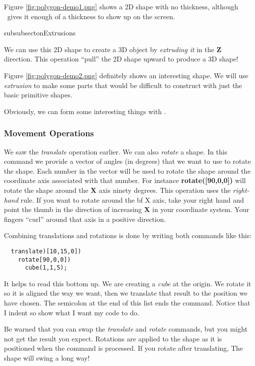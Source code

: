 Figure \ref{fig:polygon-demo1.png} shows a  2D shape with no thickness, although
\osc\ gives it enough of a thickness to show up on the screen.

subsubsecton{Extrusions}

We can use this 2D shape to create a 3D object by {\it extruding it} in the
{\bf Z} direction. This operation ``pull'' the 2D shape upward to produce a 3D
shape!


Figure \ref{fig:polygon-demo2.png} definitely shows an interesting shape. We
will use {\it extrusion} to make some parts that would be difficult to construct
with just the basic primitive shapes.


Obviously, we can form some interesting things with \osc.

\subsubsection{Movement Operations}

We saw the {\it translate} operation earlier. We can also {\it rotate} a shape.
In this command we provide a vector of angles (in degrees) that we want to use
to rotate the shape. Each number in the vector will be used to rotate the shape
around the coordinate axis associated with that number. For instance {\bf
rotate([90,0,0])} will rotate the shape around the {\bf X} axis ninety degrees.
This operation uses the {\it right-hand} rule. If you want to rotate around the
{bf X} axis, take your right hand and point the thumb in the direction of
increasing {\bf X} in your coordinate system. Your fingers ``curl'' around that
axis in a positive direction.

Combining translations and rotations is done by writing both commands like
this:

\begin{lstlisting}
  translate)[10,15,0])
    rotate[90,0,0])
      cube(1,1,5);
\end{lstlisting}

It helps to read this bottom up. We are creating a {\it cube} at the origin. We
rotate it so it is aligned the way we want, then we translate that result to
the position we have chosen. The semicolon at the end of this list ends the
command. Notice that I indent so show what I want my code to do.

Be warned that you can swap the {\it translate} and {\it rotate} commands, but
you might not get the result you expect. Rotations are applied to the shape as
it is positioned when the command is processed. If you rotate after
translating, The shape will swing a long way!

